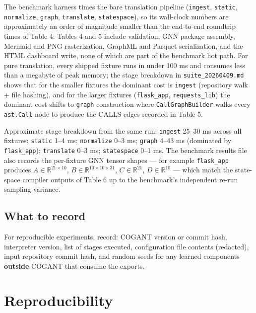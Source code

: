 \documentclass[
]{article}
\newcounter{none} %
\begin{document}
The benchmark harness times the bare translation pipeline
(\texttt{ingest}, \texttt{static}, \texttt{normalize}, \texttt{graph},
\texttt{translate}, \texttt{statespace}), so its wall-clock numbers are
approximately an order of magnitude smaller than the end-to-end
roundtrip times of Table 4: Tables 4 and 5 include validation, GNN
package assembly, Mermaid and PNG rasterization, GraphML and Parquet
serialization, and the HTML dashboard write, none of which are part of
the benchmark hot path. For pure translation, every shipped fixture runs
in under 100 ms and consumes less than a megabyte of peak memory; the
stage breakdown in \texttt{suite\_20260409.md} shows that for the
smaller fixtures the dominant cost is \texttt{ingest} (repository walk +
file hashing), and for the larger fixtures (\texttt{flask\_app},
\texttt{requests\_lib}) the dominant cost shifts to \texttt{graph}
construction where \texttt{CallGraphBuilder} walks every
\texttt{ast.Call} node to produce the CALLS edges recorded in Table 5.

Approximate stage breakdown from the same run: \texttt{ingest} 25--30 ms
across all fixtures; \texttt{static} 1--4 ms; \texttt{normalize} 0--3
ms; \texttt{graph} 4--43 ms (dominated by \texttt{flask\_app});
\texttt{translate} 0--3 ms; \texttt{statespace} 0--1 ms. The benchmark
results file also records the per-fixture GNN tensor shapes --- for
example \texttt{flask\_app} produces
\(A \in \mathbb{R}^{21 \times 10}\),
\(B \in \mathbb{R}^{10 \times 10 \times 31}\),
\(C \in \mathbb{R}^{21}\), \(D \in \mathbb{R}^{10}\) --- which match the
state-space compiler outputs of Table 6 up to the benchmark's
independent re-run sampling variance.

\subsection{What to record}\label{what-to-record}

For reproducible experiments, record: COGANT version or commit hash,
interpreter version, list of stages executed, configuration file
contents (redacted), input repository commit hash, and random seeds for
any learned components \textbf{outside} COGANT that consume the exports.

\newpage

\section{Reproducibility}\label{reproducibility}
\end{document}
